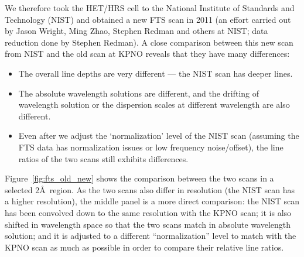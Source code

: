 We therefore took the HET/HRS cell to the National Institute of
Standards and Technology (NIST) and obtained a new FTS scan in 2011
(an effort carried out by Jason Wright, Ming Zhao, Stephen Redman and
others at NIST; data reduction done by Stephen Redman). A close
comparison between this new scan from NIST and the old scan at KPNO
reveals that they have many differences:
\begin{itemize}
  \item The overall line depths are very different --- the NIST scan
    has deeper lines.
  \item The absolute wavelength solutions are different, and the
    drifting of wavelength solution or the dispersion scales at
    different wavelength are also different.
  \item Even after we adjust the `normalization' level of the NIST
    scan (assuming the FTS data has normalization issues or low
    frequency noise/offset), the line ratios of the two scans still
    exhibits differences.
\end{itemize}

Figure~\ref{fig:fts_old_new} shows the comparison between the two
scans in a selected 2\AA\ region. As the two scans also differ in
resolution (the NIST scan has a higher resolution), the middle panel
is a more direct comparison: the NIST scan has been convolved down to
the same resolution with the KPNO scan; it is also shifted in
wavelength space so that the two scans match in absolute wavelength
solution; and it is adjusted to a different ``normalization'' level to
match with the KPNO scan as much as possible in order to compare their
relative line ratios.

